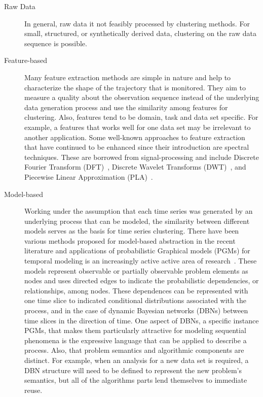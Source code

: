 \begin{description}
  \item[Raw Data] In general, raw data it not feasibly processed by clustering methods.  For small, structured, or synthetically derived data, clustering on the raw data sequence is possible.
  \item[Feature-based] Many feature extraction methods are simple in nature and help to characterize the shape of the trajectory that is monitored.  They aim to measure a quality about the observation sequence instead of the underlying data generation process and use the similarity among features for clustering.  Also, features tend to be domain, task and data set specific.  For example, a features that works well for one data set may be irrelevant to another application.  Some well-known approaches to feature extraction that have continued to be enhanced since their introduction are spectral techniques.  These are borrowed from signal-processing and include Discrete Fourier Transform (DFT)~\cite{HarrisF}, Discrete Wavelet Transforms (DWT)~\cite{Shensa}, and Piecewise Linear Approximation (PLA)~\cite{Dunham}.
  \item[Model-based] Working under the assumption that each time series was generated by an underlying process that can be modeled, the similarity between different models serves as the basis for time series clustering.  There have been various methods proposed for model-based abstraction in the recent literature and applications of probabilistic Graphical models (PGMs) for temporal modeling is an increasingly active active area of research~\cite{Jebara_07,Smyth97,Fruhwirth11}.  These models represent observable or partially observable problem elements as nodes and uses directed edges to indicate the probabilistic dependencies, or relationships, among nodes.  These dependences can be represented with one time slice to indicated conditional distributions associated with the process, and in the case of dynamic Bayesian networks (DBNs) between time slices in the direction of time.  One aspect of DBNs, a specific instance PGMs, that makes them particularly attractive for modeling sequential phenomena is the expressive language that can be applied to describe a process.  Also, that problem semantics and algorithmic components are distinct.  For example, when an analysis for a new data set is required, a DBN structure will need to be defined to represent the new problem's semantics, but all of the algorithms parts lend themselves to immediate reuse.
\end{description}

